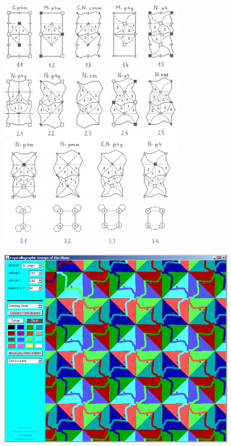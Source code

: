 \begin{frame}
  \includegraphics[width=0.7\textwidth]{illustration4.png}
\end{frame}

\begin{frame}
  \includegraphics[width=0.9\textwidth]{illustration5.png}
\end{frame}

